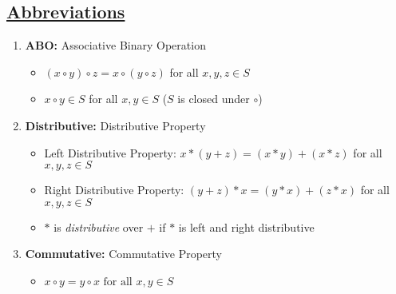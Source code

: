 \documentclass{article}
\theoremstyle{definition}
\begin{document}
\vspace{-10.0mm}
\noindent
\subsection*{\underline{Abbreviations}}

\medskip
\begin{enumerate}
\item \textbf{ABO:} Associative Binary Operation 
\begin{itemize}
\item $(x \circ y) \circ z = x \circ  (y \circ z)$  
      for all $x, y, z \in S$
\item $x \circ y \in S$ for all $x, y \in S$
      ($S$ is closed under $\circ$)
\end{itemize}

\item \textbf{Distributive:} Distributive Property 
\begin{itemize}
\item Left Distributive Property:  $x * (y+z )= (x*y) + (x*z)$ for
                                   all $x, y, z \in S$
\item Right Distributive Property: $(y + z) * x = (y*x) + (z*x)$
                                   for all $x, y, z \in S$
\item $*$ is \emph{distributive}   over $+$ if $*$ is left and 
                                   right distributive
\end{itemize}

\item \textbf{Commutative:} Commutative Property
\begin{itemize}
\item $x \circ y = y \circ x {\mbox{ for all }}x,y\in S$
\end{itemize}
\end{enumerate}


\noindent
\end{document}
